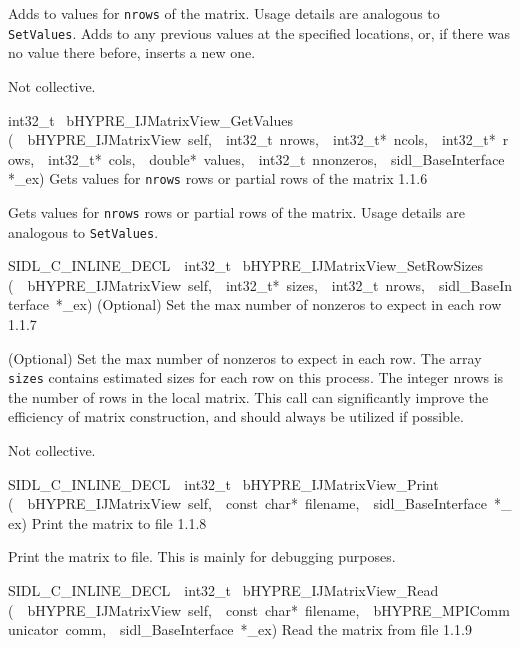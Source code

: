 \documentclass{article}
\begin{document}
\begin{cxxentry}
\begin{cxxentry}
\begin{cxxfunction}
\begin{cxxdoc}
Adds to values for {\tt nrows} of the matrix.  Usage details
are analogous to {\tt SetValues}.  Adds to any previous
values at the specified locations, or, if there was no value
there before, inserts a new one.

Not collective.
\end{cxxdoc}
\end{cxxfunction}
\begin{cxxfunction}
{int32\_t\ }
        {bHYPRE\_IJMatrixView\_GetValues}
        {(\ \ bHYPRE\_IJMatrixView\ self,\ \ int32\_t\ nrows,\ \ int32\_t*\ ncols,\ \ int32\_t*\ rows,\ \ int32\_t*\ cols,\ \ double*\ values,\ \ int32\_t\ nnonzeros,\ \ sidl\_BaseInterface\ *\_ex)}
        {
Gets values for {\tt nrows} rows or partial rows of the
matrix}
        {1.1.6}
\begin{cxxdoc}

Gets values for {\tt nrows} rows or partial rows of the
matrix.  Usage details are analogous to {\tt SetValues}.
\end{cxxdoc}
\end{cxxfunction}
\begin{cxxfunction}
{SIDL\_C\_INLINE\_DECL\ \ int32\_t\ }
        {bHYPRE\_IJMatrixView\_SetRowSizes}
        {(\ \ bHYPRE\_IJMatrixView\ self,\ \ int32\_t*\ sizes,\ \ int32\_t\ nrows,\ \ sidl\_BaseInterface\ *\_ex)}
        {
(Optional) Set the max number of nonzeros to expect in each
row}
        {1.1.7}
\begin{cxxdoc}

(Optional) Set the max number of nonzeros to expect in each
row.  The array {\tt sizes} contains estimated sizes for each
row on this process.  The integer nrows is the number of rows in
the local matrix.  This call can significantly improve the
efficiency of matrix construction, and should always be
utilized if possible.

Not collective.
\end{cxxdoc}
\end{cxxfunction}
\begin{cxxfunction}
{SIDL\_C\_INLINE\_DECL\ \ int32\_t\ }
        {bHYPRE\_IJMatrixView\_Print}
        {(\ \ bHYPRE\_IJMatrixView\ self,\ \ const\ char*\ filename,\ \ sidl\_BaseInterface\ *\_ex)}
        {
Print the matrix to file}
        {1.1.8}
\begin{cxxdoc}

Print the matrix to file.  This is mainly for debugging
purposes.
\end{cxxdoc}
\end{cxxfunction}
\begin{cxxfunction}
{SIDL\_C\_INLINE\_DECL\ \ int32\_t\ }
        {bHYPRE\_IJMatrixView\_Read}
        {(\ \ bHYPRE\_IJMatrixView\ self,\ \ const\ char*\ filename,\ \ bHYPRE\_MPICommunicator\ comm,\ \ sidl\_BaseInterface\ *\_ex)}
        {
Read the matrix from file}
        {1.1.9}
\begin{cxxdoc}


\end{cxxdoc}
\end{cxxfunction}
\end{cxxentry}
\end{cxxentry}
\end{document}
